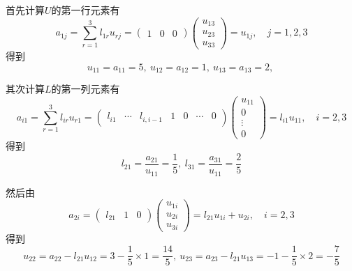 \documentclass[11pt]{article}
\begin{document}
\begin{question}
{        首先计算$U$的第一行元素有
        \begin{equation*}
            a_{1j} = \sum_{r = 1}^3{l_{1r}u_{rj}} =
            \begin{pmatrix}
                1 & 0 & 0
            \end{pmatrix}
            \begin{pmatrix}
                u_{13} \\
                u_{23} \\
                u_{33}
            \end{pmatrix}
            = u_{1j},\quad j = 1, 2, 3
        \end{equation*}
        得到
        \begin{equation*}
            u_{11} = a_{11} = 5,\
            u_{12} = a_{12} = 1,\
            u_{13} = a_{13} = 2,\
        \end{equation*}

        其次计算$L$的第一列元素有
        \begin{equation*}
            a_{i1} = \sum_{r = 1}^3{l_{ir}u_{r1}} =
            \begin{pmatrix}
                l_{i1} & \cdots & l_{i,i-1} & 1 & 0 & \cdots & 0
            \end{pmatrix}
            \begin{pmatrix}
                u_{11} \\
                0      \\
                \vdots \\
                0
            \end{pmatrix}
            = l_{i1}u_{11},\quad i = 2, 3
        \end{equation*}
        得到
        \begin{equation*}
            l_{21} = \frac{a_{21}}{u_{11}} = \frac{1}{5},\
            l_{31} = \frac{a_{31}}{u_{11}} = \frac{2}{5}
        \end{equation*}

        然后由
        \begin{equation*}
            a_{2i} =
            \begin{pmatrix}
                l_{21} & 1 & 0
            \end{pmatrix}
            \begin{pmatrix}
                u_{1i} \\
                u_{2i} \\
                u_{3i}
            \end{pmatrix}
            = l_{21}u_{1i} + u_{2i},\quad i = 2,3
        \end{equation*}
        得到
        \begin{equation*}
            u_{22} = a_{22} - l_{21}u_{12} = 3 - \frac{1}{5} \times 1 = \frac{14}{5},\ u_{23} = a_{23} - l_{21}u_{13} = -1 - \frac{1}{5} \times 2 = -\frac{7}{5}
        \end{equation*}

}
\end{question}
\end{document}
